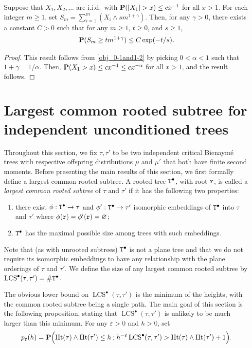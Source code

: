 \documentclass[11pt,reqno]{amsart}
\newcommand{\Ht}{\mathrm{Ht}}
\newcommand{\LCS}{\operatorname{LCS}}
\newcommand{\eps}{\varepsilon}
\renewcommand{\emptyset}{\varnothing}
\begin{document}
\begin{cor}
\label{obj_1}
Suppose that $X_1,X_2,\dots$ are i.i.d.\ with $\P(|X_1|>x)\le c x^{-1}$ for all $x>1$. For each integer $m\geq 1$, set $S_m=\sum_{i=1}^m (X_i\wedge sm^{1+\gamma})$. Then, for any $\gamma>0$, there exists a constant $C>0$ such that for any $m\ge 1$, $t\ge 0$, and $s\geq 1$,
\[\P(S_m\ge t m^{1+\gamma})\le C \exp(-t/s ) .\]
\end{cor}

\begin{proof}
This result follows from \cref{obj_0-1and1-2} by picking $0<\alpha<1$ such that $1+\gamma=1/\alpha$. Then, $\P(X_1>x)\le cx^{-1}\le c x^{-\alpha}$ for all $x>1$, and the result follows. 
\end{proof}



\section{Largest common rooted subtree for independent unconditioned trees}
\label{sec:LCS_rooted_unconditioned}



Throughout this section, we fix $\tau,\tau'$ to be two independent critical Bienaymé trees with respective offspring distributions $\mu$ and $\mu'$ that both have finite second moments.
Before presenting the main results of this section, we first formally define a largest common rooted subtree.
A rooted tree $\ttT^\bullet$, with root $\ttr$, is called a \emph{largest common rooted subtree} of $\tau$ and $\tau'$ if it has the following two properties:
\begin{enumerate}
\item[(a)] there exist $\phi:\ttT^\bullet\rightarrow \tau$ and $\phi':\ttT^\bullet\rightarrow \tau'$ isomorphic embeddings of $\ttT^\bullet$ into $\tau$ and $\tau'$ where $\phi(\ttr) = \phi'(\ttr) = \emptyset$;
\item[(b)] $\ttT^\bullet$ has the maximal possible size among trees with such embeddings.
\end{enumerate}
Note that (as with unrooted subtrees) $\ttT^\bullet$ is not a plane tree and that we do not require its isomorphic embeddings to have any relationship with the plane orderings of $\tau$ and $\tau'$.
We define the size of any largest common rooted subtree by $\LCS^\bullet(\tau,\tau') = \#\ttT^\bullet$.

The obvious lower bound on $\LCS^\bullet(\tau,\tau')$ is the minimum of the heights, with the common rooted subtree being a single path.
The main goal of this section is the following proposition, stating that $\LCS^\bullet(\tau,\tau')$ is unlikely to be much larger than this minimum.
For any $\eps > 0$ and $h >0$, set
\begin{equation}\label{eq:p-eps}
p_{\eps}(h)= \P\Big(\Ht(\tau)\wedge\Ht(\tau')\leq h\, ;\, h^{-\varepsilon}\LCS^\bullet(\tau,\tau')> \Ht(\tau)\wedge\Ht(\tau') +1 \Big).
\end{equation}
\end{document}

